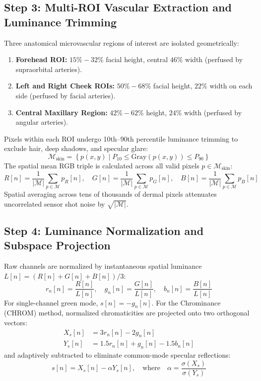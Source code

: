 \documentclass[11pt,a4paper]{report}
\begin{document}
\subsection{Step 3: Multi-ROI Vascular Extraction and Luminance Trimming}
Three anatomical microvascular regions of interest are isolated geometrically:
\begin{enumerate}
    \item \textbf{Forehead ROI:} $15\% - 32\%$ facial height, central $46\%$ width (perfused by supraorbital arteries).
    \item \textbf{Left and Right Cheek ROIs:} $50\% - 68\%$ facial height, $22\%$ width on each side (perfused by facial arteries).
    \item \textbf{Central Maxillary Region:} $42\% - 62\%$ height, $24\%$ width (perfused by angular arteries).
\end{enumerate}
Pixels within each ROI undergo 10th--90th percentile luminance trimming to exclude hair, deep shadows, and specular glare:
\begin{equation}
    \mathcal{M}_{\text{skin}} = \left\{ p(x,y) \;\big|\; P_{10} \le \text{Gray}(p(x,y)) \le P_{90} \right\}
\end{equation}
The spatial mean RGB triple is calculated across all valid pixels $p \in \mathcal{M}_{\text{skin}}$:
\begin{equation}
    R[n] = \frac{1}{|\mathcal{M}|} \sum_{p \in \mathcal{M}} p_R[n], \quad G[n] = \frac{1}{|\mathcal{M}|} \sum_{p \in \mathcal{M}} p_G[n], \quad B[n] = \frac{1}{|\mathcal{M}|} \sum_{p \in \mathcal{M}} p_B[n]
\end{equation}
Spatial averaging across tens of thousands of dermal pixels attenuates uncorrelated sensor shot noise by $\sqrt{|\mathcal{M}|}$.

\subsection{Step 4: Luminance Normalization and Subspace Projection}
Raw channels are normalized by instantaneous spatial luminance $L[n] = (R[n] + G[n] + B[n])/3$:
\begin{equation}
    r_n[n] = \frac{R[n]}{L[n]}, \quad g_n[n] = \frac{G[n]}{L[n]}, \quad b_n[n] = \frac{B[n]}{L[n]}
\end{equation}
For single-channel green mode, $s[n] = -g_n[n]$. For the Chrominance (CHROM) method, normalized chromaticities are projected onto two orthogonal vectors:
\begin{align}
    X_s[n] &= 3 r_n[n] - 2 g_n[n] \\
    Y_s[n] &= 1.5 r_n[n] + g_n[n] - 1.5 b_n[n]
\end{align}
and adaptively subtracted to eliminate common-mode specular reflections:
\begin{equation}
    s[n] = X_s[n] - \alpha Y_s[n], \quad \text{where} \quad \alpha = \frac{\sigma(X_s)}{\sigma(Y_s)}
\end{equation}
\end{document}
